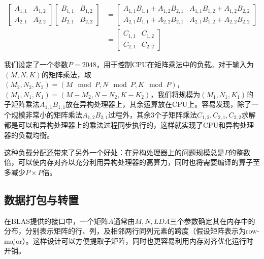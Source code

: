 \begin{equation}
    \begin{split}
        \label{分块矩阵乘法公式}
        \begin{bmatrix}
            A_{1,1} & A_{1,2} \\
            A_{2,1} & A_{2,2}
        \end{bmatrix}
        \begin{bmatrix}
            B_{1,1} & B_{1,2} \\
            B_{2,1} & B_{2,2}
        \end{bmatrix}
        &=\begin{bmatrix}
            A_{1,1}B_{1,1}+A_{1,2}B_{2,1} & A_{1,1}B_{1,2}+A_{1,2}B_{2,2} \\
            A_{2,1}B_{1,1}+A_{2,2}B_{2,1} & A_{2,1}B_{1,2}+A_{2,2}B_{2,2}
        \end{bmatrix} \\
        &= \begin{bmatrix}
            C_{1,1} & C_{1,2} \\
            C_{2,1} & C_{2,2}
        \end{bmatrix}
    \end{split}
\end{equation}

我们设定了一个参数$P=2048$，用于控制CPU在矩阵乘法中的负载。对于输入为$\left(M,N,K\right)$的矩阵乘法，取$\left(M_2,N_2,K_2\right)=\left(M \mod P,N\mod P,K\mod P\right)$，$\left(M_1,N_1,K_1\right)=\left(M-M_2,N-N_2,K-K_2\right)$，我们将规模为$\left(M_1,N_1,K_1\right)$的子矩阵乘法$A_{1,1}B_{1,1}$放在异构处理器上，其余运算放在CPU上。容易发现，除了一个规模非常小的矩阵乘法$A_{1,2}B_{2,1}$过程外，其余3个子矩阵乘法$C_{1,2},C_{2,1},C_{2,2}$求解都是可以和异构处理器上的乘法过程同步执行的，这样就实现了CPU和异构处理器的负载均衡。

这种负载分配还带来了另外一个好处：在异构处理器上的问题规模总是$P$的整数倍，可以使内存对齐以充分利用异构处理器的高算力，同时也将需要编译的算子至多减少$P\times P$倍。

\subsection{数据打包与转置}
\label{数据打包与转置}

在BLAS提供的接口中，一个矩阵$A$通常由$M,N,\mathit{LDA}$三个参数确定其在内存中的分布，分别表示矩阵的行、列，及相邻两行同列元素的跨度（假设矩阵表示为row-major）。这样设计可以方便提取子矩阵，同时也更容易利用内存对齐优化运行时开销。

